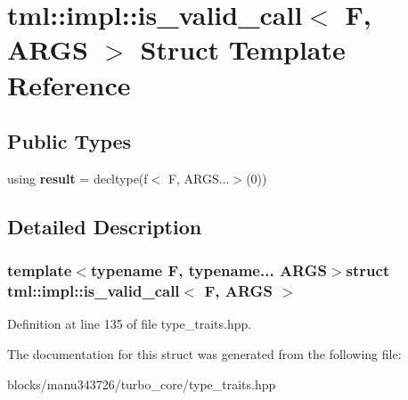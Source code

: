 \hypertarget{structtml_1_1impl_1_1is__valid__call}{\section{tml\+:\+:impl\+:\+:is\+\_\+valid\+\_\+call$<$ F, A\+R\+G\+S $>$ Struct Template Reference}
\label{structtml_1_1impl_1_1is__valid__call}
}
\subsection*{Public Types}
\begin{DoxyCompactItemize}
\item 
\hypertarget{structtml_1_1impl_1_1is__valid__call_a7179118e82b70c13e4a5ad1197c1a598}{using {\bfseries result} = decltype(f$<$ F, A\+R\+G\+S...$>$(0))}\label{structtml_1_1impl_1_1is__valid__call_a7179118e82b70c13e4a5ad1197c1a598}

\end{DoxyCompactItemize}


\subsection{Detailed Description}
\subsubsection*{template$<$typename F, typename... A\+R\+G\+S$>$struct tml\+::impl\+::is\+\_\+valid\+\_\+call$<$ F, A\+R\+G\+S $>$}



Definition at line 135 of file type\+\_\+traits.\+hpp.



The documentation for this struct was generated from the following file\+:\begin{DoxyCompactItemize}
\item 
blocks/manu343726/turbo\+\_\+core/type\+\_\+traits.\+hpp\end{DoxyCompactItemize}
